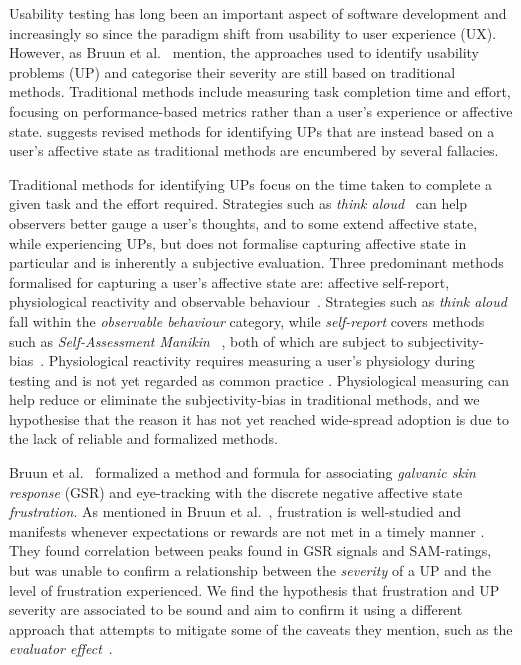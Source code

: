 Usability testing has long been an important aspect of software development and
increasingly so since the paradigm shift from usability to user experience (UX).
However, as Bruun et al.~\cite{LH-paper} mention, the approaches used to
identify usability problems (UP) and categorise their severity are still based
on traditional methods. Traditional methods include measuring task completion
time and effort, focusing on performance-based metrics rather than a user's
experience or affective state. \cite{LH-paper} suggests revised methods
for identifying UPs that are instead based on a user's affective state as
traditional methods are encumbered by several fallacies.


Traditional methods for identifying UPs focus on the time taken to complete a
given task and the effort required. Strategies such as \textit{think
aloud}~\cite{use_of_TA_and_IDA} can help observers better gauge a user's
thoughts, and to some extend affective state, while experiencing UPs, but does
not formalise capturing affective state in particular and is inherently a
subjective evaluation. Three predominant methods formalised for capturing a
user's affective state are: affective self-report, physiological reactivity and
observable behaviour~\cite{BRADLEY199449}. Strategies such as \textit{think
aloud} fall within the \textit{observable behaviour} category, while
\textit{self-report} covers methods such as \textit{Self-Assessment Manikin}
~\cite{BRADLEY199449}, both of which are subject to
subjectivity-bias~.  Physiological reactivity requires measuring a
user's physiology during testing and is not yet regarded as common practice
.  Physiological measuring can help reduce or
eliminate the subjectivity-bias in traditional methods, and we hypothesise that
the reason it has not yet reached wide-spread adoption is due to the lack of
reliable and formalized methods.

Bruun et al.~\cite{LH-paper} formalized a method and formula for associating
\textit{galvanic skin response} (GSR) and eye-tracking with the discrete
negative affective state \textit{frustration}. As mentioned in Bruun et al.~\cite{LH-paper}, frustration is well-studied
and manifests whenever expectations or rewards are not met in a timely manner
. They found correlation between peaks found in GSR signals and
SAM-ratings, but was unable to confirm a relationship between the
\textit{severity} of a UP and the level of frustration experienced. We find the
hypothesis that frustration and UP severity are associated to be sound and aim
to confirm it using a different approach that attempts to mitigate some of the
caveats they mention, such as the \textit{evaluator effect}~\cite{eval_effect}.

